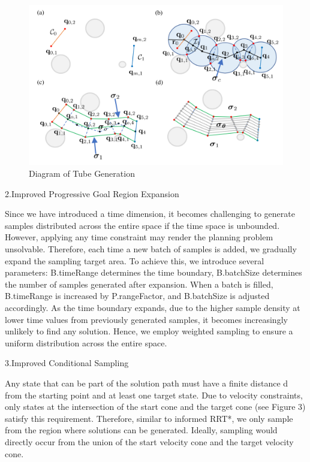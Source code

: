 \documentclass[times,authoryear]{elsarticle}
\begin{document}
\begin{figure}[htp]
	\centering
	\includegraphics[scale=0.4]{img/tube.png}
	\caption{Diagram of Tube Generation}
	\label{fig1}
\end{figure}

2.Improved Progressive Goal Region Expansion

Since we have introduced a time dimension, it becomes challenging to generate samples distributed across the entire space if the time space is unbounded. However, applying any time constraint may render the planning problem unsolvable. Therefore, each time a new batch of samples is added, we gradually expand the sampling target area. To achieve this, we introduce several parameters: B.timeRange determines the time boundary, B.batchSize determines the number of samples generated after expansion. When a batch is filled, B.timeRange is increased by P.rangeFactor, and B.batchSize is adjusted accordingly. As the time boundary expands, due to the higher sample density at lower time values from previously generated samples, it becomes increasingly unlikely to find any solution. Hence, we employ weighted sampling to ensure a uniform distribution across the entire space.

3.Improved Conditional Sampling

Any state that can be part of the solution path must have a finite distance d from the starting point and at least one target state. Due to velocity constraints, only states at the intersection of the start cone and the target cone (see Figure 3) satisfy this requirement. Therefore, similar to informed RRT*, we only sample from the region where solutions can be generated. Ideally, sampling would directly occur from the union of the start velocity cone and the target velocity cone.
\end{document}
